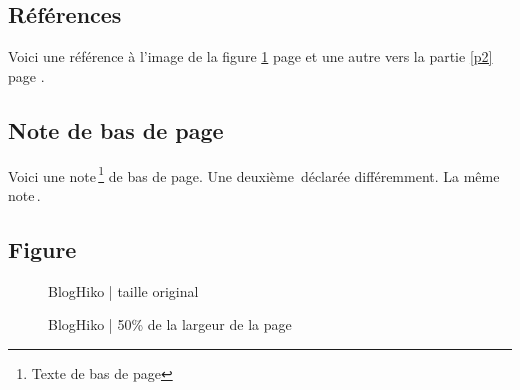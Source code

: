 \subsection{Références}

Voici une référence à l'image de la figure \ref{bloghiko} page \pageref{bloghiko} et une autre vers la partie \ref{p2} page \pageref{p2}.



\subsection{Note de bas de page}

Voici une note\,\footnote{Texte de bas de page} de bas de page.
Une deuxième\,\footnotemark{} déclarée différemment.
La même note\,\footnotemark[\value{footnote}].



\subsection{Figure}

\begin{figure}[!ht]
    \center
    \caption{BlogHiko | taille original}
    \label{bloghiko}
\end{figure}

\begin{figure}[!ht]
    \center
    \caption{BlogHiko | 50\% de la largeur de la page}
\end{figure}



